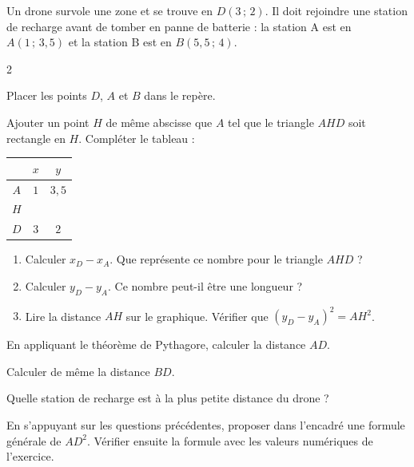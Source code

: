 Un drone survole une zone et se trouve en $D(3\,;\,2)$. Il doit rejoindre une station de recharge avant de tomber en panne de batterie : la station A est en $A(1\,;\,3{,}5)$ et la station B est en $B(5{,}5\,;\,4)$.

	\begin{MADenumerate}
		\begin{multicols}{2}

			\item Placer les points $D$, $A$ et $B$ dans le repère.

			\item Ajouter un point $H$ de même abscisse que $A$ tel que le triangle $AHD$ soit rectangle en $H$. Compléter le tableau :

			\begin{center}
				{
					\setlength{\tabcolsep}{12pt}
					\begin{tabular}{|c|c|c|}
						\hline
						    & $x$ & $y$     \\
						\hline
						$A$ & $1$ & $3{,}5$ \\
						\hline
						$H$ &     &         \\[0.3em]
						\hline
						$D$ & $3$ & $2$     \\
						\hline
					\end{tabular}
				}
			\end{center}

			\item \begin{enumerate}
				\item Calculer $x_D - x_A$. Que représente ce nombre pour le triangle $AHD$ ?
				\item Calculer $y_D - y_A$. Ce nombre peut-il être une longueur ?
				\item Lire la distance $AH$ sur le graphique. Vérifier que $(y_D - y_A)^2 = AH^2$.
			\end{enumerate}

			\item En appliquant le théorème de Pythagore, calculer la distance $AD$.

			\item Calculer de même la distance $BD$.

			\item Quelle station de recharge est à la plus petite distance du drone ?

			\item En s'appuyant sur les questions précédentes, proposer dans l'encadré une formule générale de $AD^2$. Vérifier ensuite la formule avec les valeurs numériques de l'exercice.


\end{multicols}
\end{MADenumerate}
